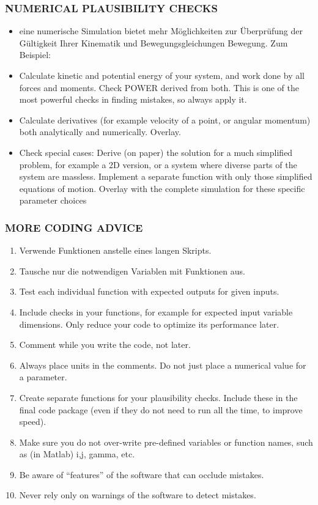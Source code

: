 \subsubsection{NUMERICAL PLAUSIBILITY CHECKS}

\begin{itemize}
    \item eine numerische Simulation bietet mehr Möglichkeiten zur Überprüfung der Gültigkeit Ihrer Kinematik und Bewegungsgleichungen 
Bewegung. Zum Beispiel:
    \item Calculate kinetic and potential energy of your system, and work done by all forces and 
moments. Check POWER derived from both. This is one of the most powerful checks in finding 
mistakes, so always apply it.
    \item Calculate derivatives (for example velocity of a point, or angular momentum) both analytically 
and numerically. Overlay. 
    \item Check special cases: Derive (on paper) the solution for a much simplified problem, for example 
a 2D version, or a system where diverse parts of the system are massless. Implement a 
separate function with only those simplified equations of motion. Overlay with the complete 
simulation for these specific parameter choices
\end{itemize}

\subsubsection{MORE CODING ADVICE}
\begin{enumerate}
    \item Verwende Funktionen anstelle eines langen Skripts. 
    \item Tausche nur die notwendigen Variablen mit Funktionen aus.
    \item Test each individual function with expected outputs for given inputs. 
    \item Include checks in your functions, for example for expected input variable dimensions. Only 
reduce your code to optimize its performance later.
    \item Comment while you write the code, not later. 
    \item  Always place units in the comments. Do not just place a numerical value for a parameter. 
    \item Create separate functions for your plausibility checks. Include these in the final code package 
(even if they do not need to run all the time, to improve speed).
    \item Make sure you do not over-write pre-defined variables or function names, such as (in Matlab) 
i,j, gamma, etc.
    \item Be aware of “features” of the software that can occlude mistakes. 
  \item  Never rely only on warnings of the software to detect mistakes.
\end{enumerate}


